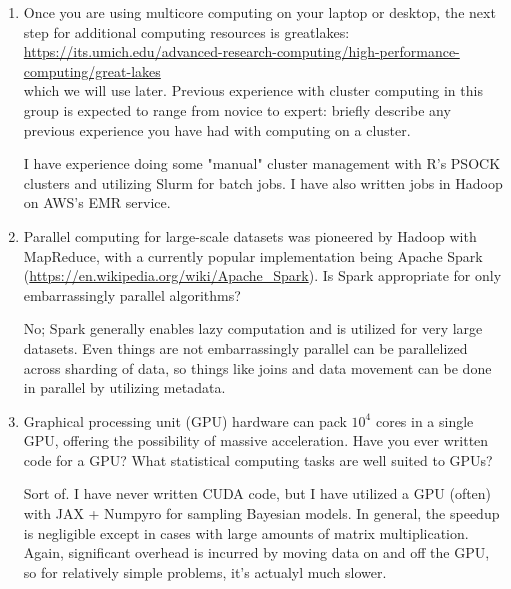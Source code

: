 \documentclass[12pt]{article}
\begin{document}
\begin{enumerate}
\begin{verbatim}
  system.time(
    foreach(i=1:10^3) %dopar% rnorm(10^5)
  ) -> time3

   system.time(
    foreach(i=1:10^4) %dopar% rnorm(10^4)
  ) -> time4
  
  rbind(time0,time1,time2,time3,time4)
\end{verbatim}

The tradeoff in each of these is between the division of tasks across CPUs and the number of cycles done completely in a single process. For some reason (which is unclear to me) dividing 10e3 tasks of 10e5 draws from a normal is "optimal" balance between fast work on one process and communication on another. 

R is strictly process based without the ability to support threading, so it incurs significant overhead when managing processes. Therefore, the amount of work on each process must be enough to "saturate" the process in a sense, without doing too much communication across processes.

\item Once you are using multicore computing on your laptop or desktop, the next step for additional computing resources is greatlakes:\\
  \url{https://its.umich.edu/advanced-research-computing/high-performance-computing/great-lakes}\\
which we will use later. Previous experience with cluster computing in this group is expected to range from novice to expert: briefly describe any previous experience you have had with computing on a cluster.

I have experience doing some "manual" cluster management with R's PSOCK clusters and utilizing Slurm for batch jobs. I have also written jobs in Hadoop on AWS's EMR service.

\item Parallel computing for large-scale datasets was pioneered by Hadoop with MapReduce, with a currently popular implementation being Apache Spark (\url{https://en.wikipedia.org/wiki/Apache_Spark}). Is Spark appropriate for only embarrassingly parallel algorithms?

No; Spark generally enables lazy computation and is utilized for very large datasets. Even things are not embarrassingly parallel can be parallelized across sharding of data, so things like joins and data movement can be done in parallel by utilizing metadata.

\item Graphical processing unit (GPU) hardware can pack $10^4$ cores in a single GPU, offering the possibility of massive acceleration. Have you ever written code for a GPU? What statistical computing tasks are well suited to GPUs?

Sort of. I have never written CUDA code, but I have utilized a GPU (often) with JAX + Numpyro for sampling Bayesian models. In general, the speedup is negligible except in cases with large amounts of matrix multiplication. Again, significant overhead is incurred by moving data on and off the GPU, so for relatively simple problems, it's actualyl much slower.

\end{enumerate}
\end{document}
